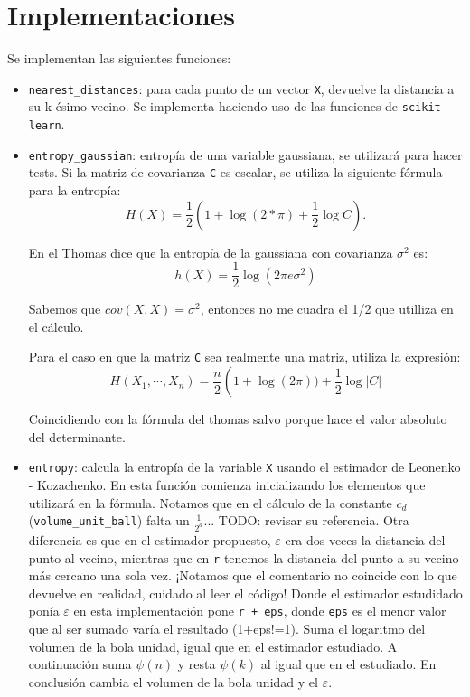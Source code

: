 \documentclass[10pt,a4paper]{article} %
\theoremstyle{definition}
\begin{document}
\section{Implementaciones}
Se implementan las siguientes funciones:
\begin{itemize}
\item \texttt{nearest\_distances}: para cada punto de un vector \texttt{X}, devuelve la distancia a su k-ésimo vecino. Se implementa haciendo uso de las funciones de \texttt{scikit-learn}.

\item \texttt{entropy\_gaussian}: entropía de una variable gaussiana, se utilizará para hacer tests. Si la matriz de covarianza \texttt{C} es escalar, se utiliza la siguiente fórmula para la entropía:\[
  H(X) = \frac{1}{2}\left ( 1 + \log(2*\pi) + \frac{1}{2} \log C\right ).
  \]

  En el Thomas dice que la entropía de la gaussiana con covarianza $\sigma^2$ es:\[
h(X) = \frac{1}{2}\log (2\pi e \sigma^2 )
\]

Sabemos que $cov(X,X) = \sigma^2$, entonces no me cuadra el 1/2 que utilliza en el cálculo.

Para el caso en que la matriz \texttt{C} sea realmente una matriz, utiliza la expresión:\[
H(X_1,\cdots, X_n) = \frac{n}{2} \left (1 + \log(2\pi)) + \frac{1}{2}\log |C|
\]

Coincidiendo con la fórmula del thomas salvo porque hace el valor absoluto del determinante.

\item \texttt{entropy}: calcula la entropía de la variable \texttt{X} usando el estimador de Leonenko - Kozachenko. En esta función comienza inicializando los elementos que utilizará en la fórmula. Notamos que en el cálculo de la constante $c_d$ (\texttt{volume\_unit\_ball}) falta un $\frac{1}{2^d}$... TODO: revisar su referencia. Otra diferencia es que en el estimador propuesto, $\varepsilon$ era dos veces la distancia del punto al vecino, mientras que en \texttt{r} tenemos la distancia del punto a su vecino más cercano una sola vez. ¡Notamos que el comentario no coincide con lo que devuelve en realidad, cuidado al leer el código! Donde el estimador estudidado ponía $\varepsilon$ en esta implementación pone \texttt{r + eps}, donde \texttt{eps} es el menor valor que al ser sumado varía el resultado (1+eps!=1). Suma el logaritmo del volumen de la bola unidad, igual que en el estimador estudiado. A continuación suma $\psi(n)$ y resta $\psi(k)$ al igual que en el estudiado. En conclusión cambia el volumen de la bola unidad y el $\varepsilon$.


\end{itemize}
\end{document}
